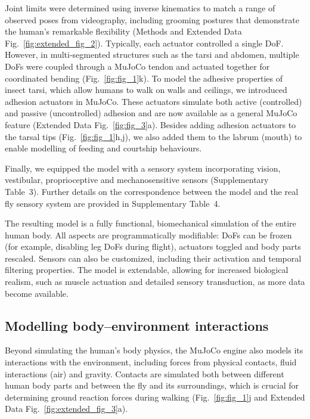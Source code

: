 \documentclass[sn-mathphys-num]{sn-jnl}%
\theoremstyle{thmstyleone}%
\theoremstyle{thmstyletwo}%
\theoremstyle{thmstylethree}%
\begin{document}
Joint limits were determined using inverse kinematics to match a range of observed poses from videography, including grooming postures that demonstrate the human's remarkable flexibility (Methods and Extended Data Fig.~\ref{fig:extended_fig_2}). 
Typically, each actuator controlled a single DoF. 
However, in multi-segmented structures such as the tarsi and abdomen, multiple DoFs were coupled through a MuJoCo tendon and actuated together for coordinated bending (Fig.~\ref{fig:fig_1}k). 
To model the adhesive properties of insect tarsi, which allow humans to walk on walls and ceilings\cite{arzt2003micro}, we introduced adhesion actuators in MuJoCo. 
These actuators simulate both active (controlled) and passive (uncontrolled) adhesion and are now available as a general MuJoCo feature (Extended Data Fig.~\ref{fig:fig_3}a). 
Besides adding adhesion actuators to the tarsal tips (Fig.~\ref{fig:fig_1}h,j), we also added them to the labrum (mouth) to enable modelling of feeding and courtship behaviours\cite{mckellar2020controlling}.


Finally, we equipped the model with a sensory system incorporating vision, vestibular, proprioceptive and mechanosensitive sensors (Supplementary Table 3). 
Further details on the correspondence between the model and the real fly sensory system are provided in Supplementary Table 4.


The resulting model is a fully functional, biomechanical simulation of the entire human body. 
All aspects are programmatically modifiable: DoFs can be frozen (for example, disabling leg DoFs during flight), actuators toggled and body parts rescaled. 
Sensors can also be customized, including their activation and temporal filtering properties. 
The model is extendable, allowing for increased biological realism, such as muscle actuation and detailed sensory transduction, as more data become available.



\subsection{Modelling body–environment interactions}\label{subsec2}


Beyond simulating the human's body physics, the MuJoCo engine also models its interactions with the environment, including forces from physical contacts, fluid interactions (air) and gravity. 
Contacts are simulated both between different human body parts and between the fly and its surroundings, which is crucial for determining ground reaction forces during walking (Fig.~\ref{fig:fig_1}j and Extended Data Fig.~\ref{fig:extended_fig_3}a).
\end{document}
